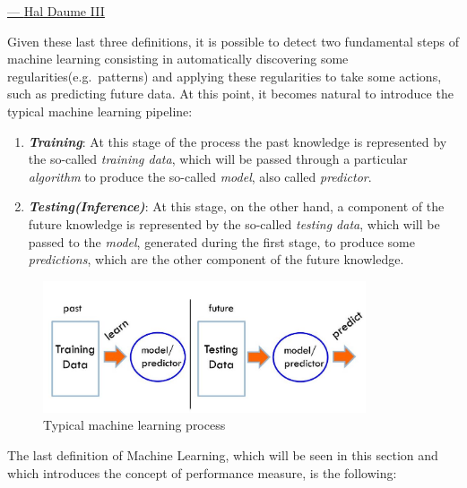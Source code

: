 \hspace{325pt}
\href{https://www.cs.ubc.ca/~murphyk/}{--- \underline{Hal Daume III}}

\vspace{10mm}

Given these last three definitions, it is possible to detect two
fundamental steps of machine learning consisting in automatically
discovering some regularities(e.g.\ patterns) and applying these
regularities to take some actions, such as predicting future data. At
this point, it becomes natural to introduce the typical machine learning
pipeline:

\begin{enumerate}
    \item \emph{\textbf{Training}}: At this stage of the process the
          past knowledge is represented by the so-called \emph{training data},
          which will be passed through a particular \emph{algorithm}
          to produce the so-called \emph{model}, also called
          \emph{predictor}.
    \item \emph{\textbf{Testing(Inference)}}: At this stage, on the
          other hand, a component of the future knowledge is represented
          by the so-called \emph{testing data}, which will be passed to
          the \emph{model}, generated during the first stage, to produce
          some \emph{predictions}, which are the other component of the
          future knowledge.
\end{enumerate}

\vspace{5mm}

\begin{figure}[h]
    \centering
    \includegraphics[width=0.85\textwidth]{../img/Typical_ML_process}
    \caption{Typical machine learning process}
\end{figure}

\newpage

The last definition of Machine Learning, which will be seen in this
section and which introduces the concept of performance measure, is the
following:

